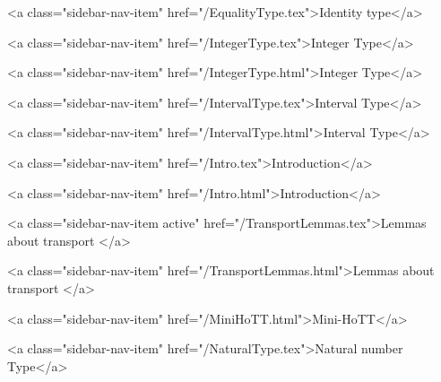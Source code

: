       
        
          <a class="sidebar-nav-item" href="/EqualityType.tex">Identity type</a>
        
      
    
      
        
          <a class="sidebar-nav-item" href="/IntegerType.tex">Integer Type</a>
        
      
    
      
        
          <a class="sidebar-nav-item" href="/IntegerType.html">Integer Type</a>
        
      
    
      
        
          <a class="sidebar-nav-item" href="/IntervalType.tex">Interval Type</a>
        
      
    
      
        
          <a class="sidebar-nav-item" href="/IntervalType.html">Interval Type</a>
        
      
    
      
        
          <a class="sidebar-nav-item" href="/Intro.tex">Introduction</a>
        
      
    
      
        
          <a class="sidebar-nav-item" href="/Intro.html">Introduction</a>
        
      
    
      
        
          <a class="sidebar-nav-item active" href="/TransportLemmas.tex">Lemmas about transport </a>
        
      
    
      
        
          <a class="sidebar-nav-item" href="/TransportLemmas.html">Lemmas about transport </a>
        
      
    
      
        
          <a class="sidebar-nav-item" href="/MiniHoTT.html">Mini-HoTT</a>
        
      
    
      
        
          <a class="sidebar-nav-item" href="/NaturalType.tex">Natural number Type</a>
        
      
    
